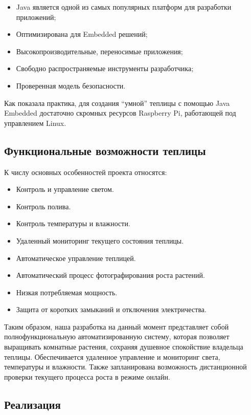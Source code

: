\documentclass[10pt, a5paper]{article}
\begin{document}
\begin{itemize}
  \item Java является одной из самых популярных платформ для разработки приложений;
  \item Оптимизирована для Embedded решений;
  \item Высокопроизводительные, переносимые приложения;
  \item Свободно распространяемые инструменты разработчика;
  \item Проверенная модель безопасности.
\end{itemize}

Как показала практика, для создания ``умной'' теплицы с помощью Java Embedded достаточно скромных ресурсов Raspberry Pi, работающей под управлением Linux.

\subsection*{Функциональные возможности теплицы}

К числу основных особенностей проекта относятся:

\begin{itemize}
  \item Контроль и управление светом.
  \item Контроль полива.
  \item Контроль температуры и влажности.
  \item Удаленный мониторинг текущего состояния теплицы.
  \item Автоматическое управление теплицей.
  \item Автоматический процесс фотографирования роста растений.
  \item Низкая потребляемая мощность.
  \item Защита от коротких замыканий и отключения электричества.
\end{itemize}

Таким образом, наша разработка на данный момент представляет собой полнофункциональную автоматизированную систему, которая позволяет выращивать комнатные растения, сохраняя душевное спокойствие владельца теплицы. Обеспечивается удаленное управление и мониторинг света, температуры и влажности. Также запланирована возможность дистанционной проверки текущего процесса роста в режиме онлайн.

\subsection*{Реализация}
\end{document}
